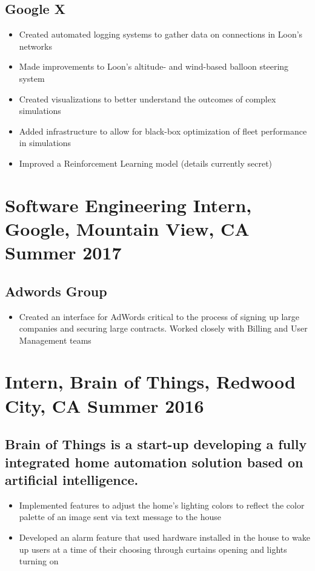 \documentclass{article}
\begin{document}
\subsection*{Google X}
\begin{itemize}[noitemsep]
    \item Created automated logging systems to gather data on connections in Loon’s networks
    \item Made improvements to Loon's altitude- and wind-based balloon steering system
    \item Created visualizations to better understand the outcomes of complex simulations
    \item Added infrastructure to allow for black-box optimization of fleet performance in simulations
    \item Improved a Reinforcement Learning model (details currently secret)
\end{itemize}

\section*{\textbf{Software Engineering Intern, Google, Mountain View, CA \hfill Summer 2017}}
\subsection*{Adwords Group}
\begin{itemize}
    \item Created an interface for AdWords critical to the process of signing up large companies and securing large contracts. Worked closely with Billing and User Management teams
\end{itemize}

\section*{\textbf{Intern, Brain of Things, Redwood City, CA	\hfill Summer 2016}}
\subsection*{Brain of Things is a start-up developing a fully integrated home automation solution based on artificial intelligence. }
\begin{itemize}[noitemsep]
    \item Implemented features to adjust the home's lighting colors to reflect the color palette of an image sent via text message to the house
    \item Developed an alarm feature that used hardware installed in the house to wake up users at a time of their choosing through curtains opening and lights turning on
\end{itemize}
\end{document}
